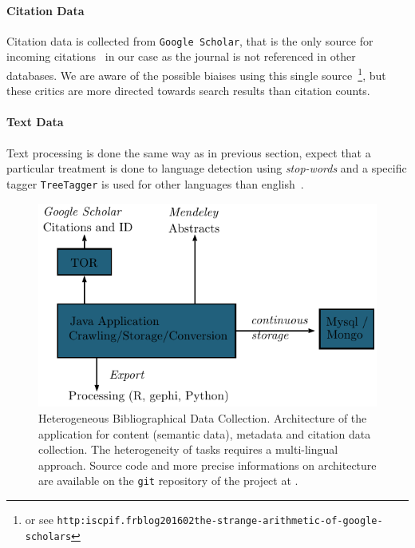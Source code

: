 \paragraph{Citation Data}
Citation data is collected from \texttt{Google Scholar}, that is the only source for incoming citations~\cite{noruzi2005google} in our case as the journal is not referenced in other databases. We are aware of the possible biaises using this single source~\cite{bohannon2014scientific}\footnote{or see \texttt{http:\/\/iscpif.fr\/blog\/2016\/02\/the-strange-arithmetic-of-google-scholars}}, but these critics are more directed towards search results than citation counts. 


\paragraph{Text Data}


Text processing is done the same way as in previous section, expect that a particular treatment is done to language detection using \emph{stop-words} and a specific tagger \texttt{TreeTagger} is used for other languages than english~\cite{schmid1994probabilistic}.


\begin{figure}
\includegraphics[width=\textwidth]{figures/archi}
\caption[Heterogeneous Bibliographical Data Collection]{Heterogeneous Bibliographical Data Collection. Architecture of the application for content (semantic data), metadata and citation data collection. The heterogeneity of tasks requires a multi-lingual approach. Source code and more precise informations on architecture are available on the \texttt{git} repository of the project at \texttt{}.}
\label{fig:datacollection}
\end{figure}




